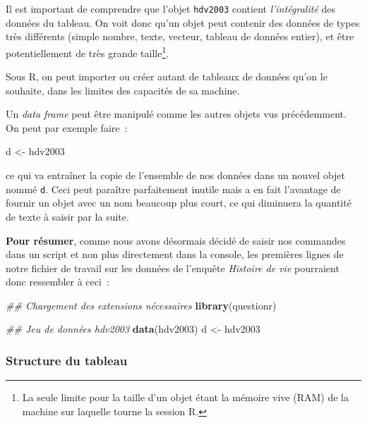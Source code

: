 \documentclass[12pt,]{book}
\makeatletter
\newenvironment{Shaded}{\begin{snugshade}}{\end{snugshade}}
\newcommand{\CommentTok}[1]{\textcolor[rgb]{0.37,0.37,0.37}{\textit{#1}}}
\newcommand{\KeywordTok}[1]{\textcolor[rgb]{0.27,0.27,0.27}{\textbf{#1}}}
\newcommand{\NormalTok}[1]{#1}
\newcommand{\StringTok}[1]{\textcolor[rgb]{0.5,0.5,0.5}{#1}}
\newenvironment{kframe}{%
\medskip{}
\setlength{\fboxsep}{.8em}
 \def\at@end@of@kframe{}%
 \ifinner\ifhmode%
  \def\at@end@of@kframe{\end{minipage}}%
  \begin{minipage}{\columnwidth}%
 \fi\fi%
 \def\FrameCommand##1{\hskip\@totalleftmargin \hskip-\fboxsep
 \colorbox{shadecolor}{##1}\hskip-\fboxsep
     \hskip-\linewidth \hskip-\@totalleftmargin \hskip\columnwidth}%
 \MakeFramed {\advance\hsize-\width
   \@totalleftmargin\z@ \linewidth\hsize
   \@setminipage}}%
 {\par\unskip\endMakeFramed%
 \at@end@of@kframe}
\newenvironment{rmdblock}[1]
  {
  \begin{itemize}
  \renewcommand{\labelitemi}{
    \raisebox{-.7\height}[0pt][0pt]{
      {\setkeys{Gin}{width=3em,keepaspectratio}\texttt{[image: images/\#1]}}
    }
  }
  \setlength{\fboxsep}{1em}
  \begin{kframe}
  \item
  }
  {
  \end{kframe}
  \end{itemize}
  }
\newenvironment{rmdnote}
  {\begin{rmdblock}{note}}
  {\end{rmdblock}}
\makeatother
\begin{document}
Il est important de comprendre que l'objet \texttt{hdv2003} contient \emph{l'intégralité} des données du tableau.
On voit donc qu'un objet peut contenir des données de types très différents (simple nombre, texte, vecteur, tableau de données entier), et être potentiellement de très grande taille\footnote{La seule limite pour la taille d'un objet étant la mémoire vive (RAM) de la machine sur laquelle tourne la session R.}.

\begin{rmdnote}
Sous R, on peut importer ou créer autant de tableaux de données qu'on le souhaite, dans les limites des capacités de sa machine.
\end{rmdnote}

Un \emph{data frame} peut être manipulé comme les autres objets vus précédemment. On peut par exemple faire~:

\begin{Shaded}
\begin{Highlighting}[]
\NormalTok{d <-}\StringTok{ }\NormalTok{hdv2003}
\end{Highlighting}
\end{Shaded}

ce qui va entraîner la copie de l'ensemble de nos données dans un nouvel objet nommé \texttt{d}. Ceci peut paraître parfaitement inutile mais a en fait l'avantage de fournir un objet avec un nom beaucoup plus court, ce qui diminuera la quantité de texte à saisir par la suite.

\textbf{Pour résumer}, comme nous avons désormais décidé de saisir nos commandes dans un script et non plus directement dans la console, les premières lignes de notre fichier de travail sur les données de l'enquête \emph{Histoire de vie} pourraient donc ressembler à ceci~:

\begin{Shaded}
\begin{Highlighting}[]
\CommentTok{## Chargement des extensions nécessaires}
\KeywordTok{library}\NormalTok{(questionr)}

\CommentTok{## Jeu de données hdv2003}
\KeywordTok{data}\NormalTok{(hdv2003)}
\NormalTok{d <-}\StringTok{ }\NormalTok{hdv2003}
\end{Highlighting}
\end{Shaded}

\hypertarget{structure-du-tableau}{%
\subsubsection{Structure du tableau}\label{structure-du-tableau}}
\end{document}
